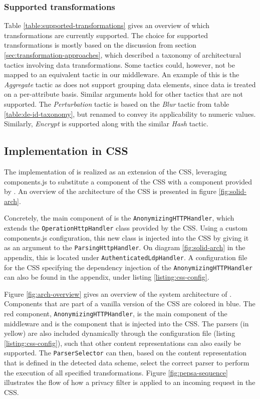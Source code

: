 \subsubsection{Supported transformations}
Table \ref{table:supported-transformations} gives an overview of which transformations are currently supported. The choice for supported transformations is mostly based on the discussion from section \ref{sec:transformation-approaches}, which described a taxonomy of architectural tactics involving data transformations. Some tactics could, however, not be mapped to an equivalent tactic in our middleware. An example of this is the \textit{Aggregate} tactic as \middleware{} does not support grouping data elements, since data is treated on a per-attribute basis. Similar arguments hold for other tactics that are not supported. The \textit{Perturbation} tactic is based on the \textit{Blur} tactic from table \ref{table:de-id-taxonomy}, but renamed to convey its applicability to numeric values. Similarly, \textit{Encrypt} is supported along with the similar \textit{Hash} tactic.

\subsection{Implementation in CSS}
The implementation of \middleware{} is realized as an extension of the \acrlong{CSS}, leveraging components.js to substitute a component of the \gls{CSS} with a component provided by \middleware{}. An overview of the architecture of the \gls{CSS} is presented in figure \ref{fig:solid-arch}.

Concretely, the main component of \middleware{} is the \texttt{AnonymizingHTTPHandler}, which extends the \texttt{OperationHttpHandler} class provided by the \gls{CSS}. Using a custom components.js configuration, this new class is injected into the \gls{CSS} by giving it as an argument to the \texttt{ParsingHttpHandler}. On diagram \ref{fig:solid-arch} in the appendix, this is located under \texttt{AuthenticatedLdpHandler}. A configuration file for the \gls{CSS} specifying the dependency injection of the \texttt{AnonymizingHTTPHandler} can also be found in the appendix, under listing \ref{listing:css-config}.

Figure \ref{fig:arch-overview} gives an overview of the system architecture of \middleware{}. Components that are part of a vanilla version of the \gls{CSS} are colored in blue. The red component, \texttt{AnonymizingHTTPHandler}, is the main component of the middleware and is the component that is injected into the \gls{CSS}. The parsers (in yellow) are also included dynamically through the configuration file (listing \ref{listing:css-config}), such that other content representations can also easily be supported. The \texttt{ParserSelector} can then, based on the content representation that is defined in the detected data scheme, select the correct parser to perform the execution of all specified transformations. 
Figure \ref{fig:pepsa-sequence} illustrates the flow of how a privacy filter is applied to an incoming request in the \gls{CSS}.

